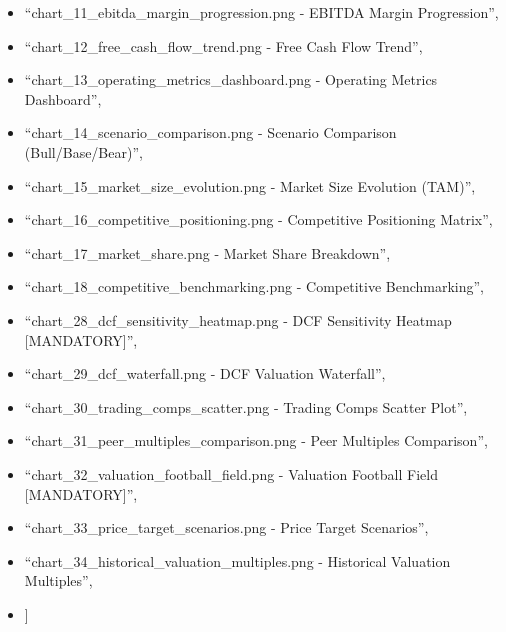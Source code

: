 \documentclass[11pt]{article}
\begin{document}
\begin{itemize}[leftmargin=*,itemsep=2pt,topsep=2pt]
\item {} ``chart\_\allowbreak{}11\_\allowbreak{}ebitda\_\allowbreak{}margin\_\allowbreak{}progression.png - EBITDA Margin Progression'',
\item {} ``chart\_\allowbreak{}12\_\allowbreak{}free\_\allowbreak{}cash\_\allowbreak{}flow\_\allowbreak{}trend.png - Free Cash Flow Trend'',
\item {} ``chart\_\allowbreak{}13\_\allowbreak{}operating\_\allowbreak{}metrics\_\allowbreak{}dashboard.png - Operating Metrics Dashboard'',
\item {} ``chart\_\allowbreak{}14\_\allowbreak{}scenario\_\allowbreak{}comparison.png - Scenario Comparison (Bull/Base/Bear)'',
\item {} ``chart\_\allowbreak{}15\_\allowbreak{}market\_\allowbreak{}size\_\allowbreak{}evolution.png - Market Size Evolution (TAM)'',
\item {} ``chart\_\allowbreak{}16\_\allowbreak{}competitive\_\allowbreak{}positioning.png - Competitive Positioning Matrix'',
\item {} ``chart\_\allowbreak{}17\_\allowbreak{}market\_\allowbreak{}share.png - Market Share Breakdown'',
\item {} ``chart\_\allowbreak{}18\_\allowbreak{}competitive\_\allowbreak{}benchmarking.png - Competitive Benchmarking'',
\item {} ``chart\_\allowbreak{}28\_\allowbreak{}dcf\_\allowbreak{}sensitivity\_\allowbreak{}heatmap.png - DCF Sensitivity Heatmap [MANDATORY]'',
\item {} ``chart\_\allowbreak{}29\_\allowbreak{}dcf\_\allowbreak{}waterfall.png - DCF Valuation Waterfall'',
\item {} ``chart\_\allowbreak{}30\_\allowbreak{}trading\_\allowbreak{}comps\_\allowbreak{}scatter.png - Trading Comps Scatter Plot'',
\item {} ``chart\_\allowbreak{}31\_\allowbreak{}peer\_\allowbreak{}multiples\_\allowbreak{}comparison.png - Peer Multiples Comparison'',
\item {} ``chart\_\allowbreak{}32\_\allowbreak{}valuation\_\allowbreak{}football\_\allowbreak{}field.png - Valuation Football Field [MANDATORY]'',
\item {} ``chart\_\allowbreak{}33\_\allowbreak{}price\_\allowbreak{}target\_\allowbreak{}scenarios.png - Price Target Scenarios'',
\item {} ``chart\_\allowbreak{}34\_\allowbreak{}historical\_\allowbreak{}valuation\_\allowbreak{}multiples.png - Historical Valuation Multiples'',
\item {} ]

\end{itemize}
\end{document}
